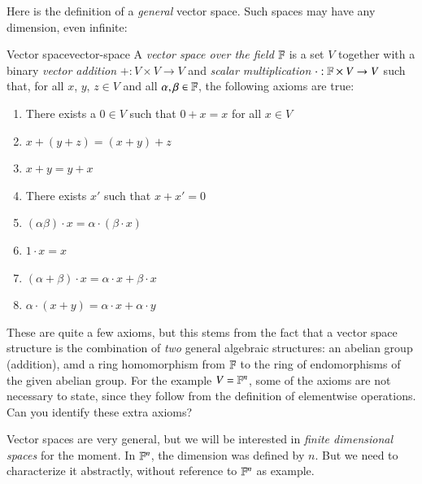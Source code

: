Here is the definition of a \emph{general} vector space. Such spaces may have any dimension, even infinite:
\begin{myDefinition}{Vector space}{vector-space}
    A \emph{vector space over the field $\mathbb{F}$} is a set $V$ together with a binary \emph{vector addition} $+ : V \times V \to V$ and \emph{scalar multiplication} $\cdot : \mathbb{F} \times V \to V$ such that, for all $x$, $y$, $z \in V$ and all $\alpha,\beta \in \mathbb{F}$, the following axioms are true:
    \begin{enumerate}
        \item There exists a $0\in V$ such that $0 + x = x$ for all $x\in V$ 
        \item  $ x + (y + z) = (x + y) + z$ 
        \item $x + y = y + x$ 
        \item There exists $x'$ such that $x+x'=0$ 
        \item $(\alpha\beta)\cdot x = \alpha\cdot(\beta\cdot x)$ 
        \item $1\cdot x = x$ 
        \item $(\alpha + \beta)\cdot x = \alpha\cdot x + \beta\cdot x$ 
        \item $\alpha \cdot (x + y) = \alpha\cdot x + \alpha \cdot y$ 
    \end{enumerate}
\end{myDefinition}



These are quite a few axioms, but this stems from the fact that a vector space structure is the combination of \emph{two} general algebraic structures: an abelian group (addition), amd a ring homomorphism from $\mathbb{F}$ to the ring of endomorphisms of the given abelian group. For the example $V = \mathbb{F}^n$, some of the axioms are not necessary to state, since they follow from the definition of elementwise operations. Can you identify these extra axioms?

Vector spaces are very general, but we will be interested in \emph{finite dimensional spaces} for the moment. In $\mathbb{F}^n$, the dimension was defined by $n$. But we need to characterize it abstractly, without reference to $\mathbb{F}^n$ as example.

